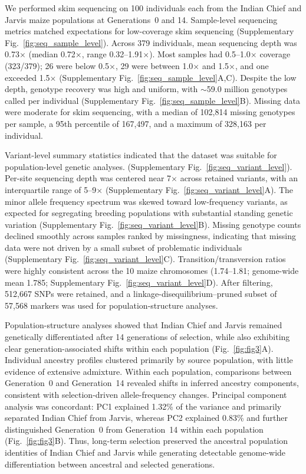 \documentclass[pdflatex,sn-mathphys-num]{sn-jnl}%
\theoremstyle{thmstyleone}%
\theoremstyle{thmstyletwo}%
\theoremstyle{thmstylethree}%
\begin{document}
We performed skim sequencing on 100 individuals each from the Indian Chief and Jarvis maize populations at Generations~0 and 14. Sample-level sequencing metrics matched expectations for low-coverage skim sequencing (Supplementary Fig.~\ref{fig:seq_sample_level}). Across 379 individuals, mean sequencing depth was 0.73$\times$ (median 0.72$\times$, range 0.32--1.91$\times$). Most samples had 0.5--1.0$\times$ coverage (323/379); 26 were below 0.5$\times$, 29 were between 1.0$\times$ and 1.5$\times$, and one exceeded 1.5$\times$ (Supplementary Fig.~\ref{fig:seq_sample_level}A,C). Despite the low depth, genotype recovery was high and uniform, with $\sim$59.0 million genotypes called per individual (Supplementary Fig.~\ref{fig:seq_sample_level}B). Missing data were moderate for skim sequencing, with a median of 102{,}814 missing genotypes per sample, a 95th percentile of 167{,}497, and a maximum of 328{,}163 per individual.

Variant-level summary statistics indicated that the dataset was suitable for population-level genetic analyses. (Supplementary Fig.~\ref{fig:seq_variant_level}). Per-site sequencing depth was centered near 7$\times$ across retained variants, with an interquartile range of 5–9$\times$ (Supplementary Fig.~\ref{fig:seq_variant_level}A). The minor allele frequency spectrum was skewed toward low-frequency variants, as expected for segregating breeding populations with substantial standing genetic variation (Supplementary Fig.~\ref{fig:seq_variant_level}B). Missing genotype counts declined smoothly across samples ranked by missingness, indicating that missing data were not driven by a small subset of problematic individuals (Supplementary Fig.~\ref{fig:seq_variant_level}C). Transition/transversion ratios were highly consistent across the 10 maize chromosomes (1.74–1.81; genome-wide mean 1.785; Supplementary Fig.~\ref{fig:seq_variant_level}D). After filtering, 512,667 SNPs were retained, and a linkage-disequilibrium–pruned subset of 57,568 markers was used for population-structure analyses.





Population-structure analyses showed that Indian Chief and Jarvis remained genetically differentiated after 14 generations of selection, while also exhibiting clear generation-associated shifts within each population (Fig.~\ref{fig:fig3}A). Individual ancestry profiles clustered primarily by source population, with little evidence of extensive admixture. Within each population, comparisons between Generation~0 and Generation~14 revealed shifts in inferred ancestry components, consistent with selection-driven allele-frequency changes. Principal component analysis was concordant: PC1 explained 1.32\% of the variance and primarily separated Indian Chief from Jarvis, whereas PC2 explained 0.83\% and further distinguished Generation~0 from Generation~14 within each population (Fig.~\ref{fig:fig3}B). Thus, long-term selection preserved the ancestral population identities of Indian Chief and Jarvis while generating detectable genome-wide differentiation between ancestral and selected generations.
\end{document}
